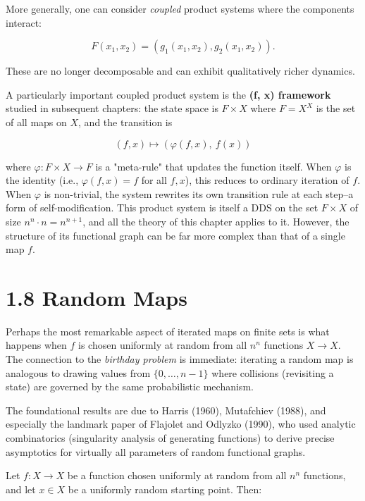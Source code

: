 More generally, one can consider \textit{coupled} product systems where the components interact:

\[
F(x_1, x_2) = (g_1(x_1, x_2), g_2(x_1, x_2)).
\]

These are no longer decomposable and can exhibit qualitatively richer dynamics.

A particularly important coupled product system is the \textbf{(f, x) framework} studied in subsequent chapters: the state space is $F \times X$ where $F = X^X$ is the set of all maps on $X$, and the transition is

\[
(f, x) \longmapsto (\varphi(f, x),\ f(x))
\]

where $\varphi: F \times X \to F$ is a "meta-rule" that updates the function itself. When $\varphi$ is the identity (i.e., $\varphi(f,x) = f$ for all $f, x$), this reduces to ordinary iteration of $f$. When $\varphi$ is non-trivial, the system rewrites its own transition rule at each step--a form of self-modification. This product system is itself a DDS on the set $F \times X$ of size $n^n \cdot n = n^{n+1}$, and all the theory of this chapter applies to it. However, the structure of its functional graph can be far more complex than that of a single map $f$.

\section{1.8 Random Maps}

Perhaps the most remarkable aspect of iterated maps on finite sets is what happens when $f$ is chosen uniformly at random from all $n^n$ functions $X \to X$. The connection to the \textit{birthday problem} is immediate: iterating a random map is analogous to drawing values from $\{ 0, \ldots, n-1\} $ where collisions (revisiting a state) are governed by the same probabilistic mechanism.

The foundational results are due to Harris (1960), Mutafchiev (1988), and especially the landmark paper of Flajolet and Odlyzko (1990), who used analytic combinatorics (singularity analysis of generating functions) to derive precise asymptotics for virtually all parameters of random functional graphs.

\begin{theorem}
Let $f: X \to X$ be a function chosen uniformly at random from all $n^n$ functions, and let $x \in X$ be a uniformly random starting point. Then:
\end{theorem}

